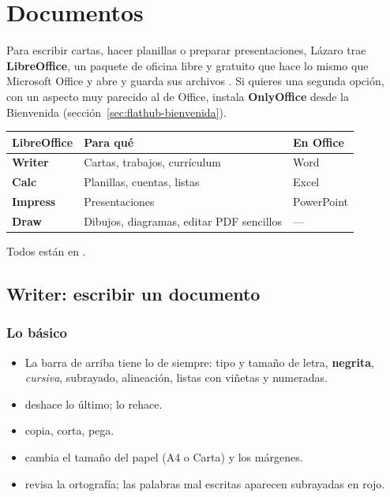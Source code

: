 \chapter{Documentos}\label{cap:08-documentos}

Para escribir cartas, hacer planillas o preparar presentaciones, Lázaro
trae \textbf{LibreOffice}, un paquete de oficina libre y gratuito que hace
lo mismo que Microsoft Office y abre y guarda sus archivos
\cite{libreoffice-ayuda}. Si quieres una segunda opción, con un aspecto muy
parecido al de Office, instala \textbf{OnlyOffice} desde la Bienvenida
(sección~\ref{sec:flathub-bienvenida}).

\begin{center}
\begin{tabularx}{\textwidth}{>{\bfseries}lXl}
\toprule
LibreOffice & Para qué & En Office \\
\midrule
Writer & Cartas, trabajos, currículum & Word \\
Calc & Planillas, cuentas, listas & Excel \\
Impress & Presentaciones & PowerPoint \\
Draw & Dibujos, diagramas, editar PDF sencillos & --- \\
\bottomrule
\end{tabularx}
\end{center}

Todos están en .

\section{Writer: escribir un documento}


\subsection{Lo básico}
\begin{itemize}
  \item La barra de arriba tiene lo de siempre: tipo y tamaño de letra,
        \textbf{negrita}, \emph{cursiva}, subrayado, alineación, listas con
        viñetas y numeradas.
  \item {} deshace lo último;  lo rehace.
  \item {} copia,  corta, 
        pega.
  \item {} cambia el tamaño del papel (A4 o Carta) y
        los márgenes.
  \item {} revisa la ortografía; las palabras
        mal escritas aparecen subrayadas en rojo.
\end{itemize}

